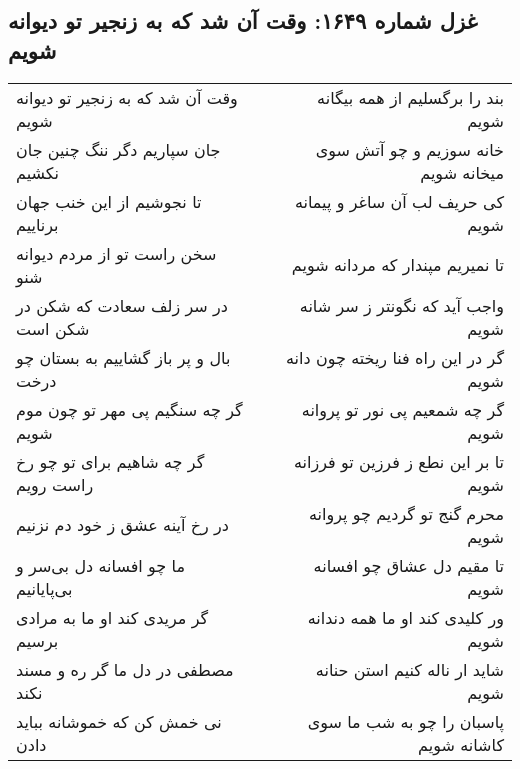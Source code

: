 \begin{center}
\section*{غزل شماره ۱۶۴۹: وقت آن شد که به زنجیر تو دیوانه شویم}
\label{sec:1649}
\begin{longtable}{l p{0.5cm} r}
وقت آن شد که به زنجیر تو دیوانه شویم
&&
بند را برگسلیم از همه بیگانه شویم
\\
جان سپاریم دگر ننگ چنین جان نکشیم
&&
خانه سوزیم و چو آتش سوی میخانه شویم
\\
تا نجوشیم از این خنب جهان برناییم
&&
کی حریف لب آن ساغر و پیمانه شویم
\\
سخن راست تو از مردم دیوانه شنو
&&
تا نمیریم مپندار که مردانه شویم
\\
در سر زلف سعادت که شکن در شکن است
&&
واجب آید که نگونتر ز سر شانه شویم
\\
بال و پر باز گشاییم به بستان چو درخت
&&
گر در این راه فنا ریخته چون دانه شویم
\\
گر چه سنگیم پی مهر تو چون موم شویم
&&
گر چه شمعیم پی نور تو پروانه شویم
\\
گر چه شاهیم برای تو چو رخ راست رویم
&&
تا بر این نطع ز فرزین تو فرزانه شویم
\\
در رخ آینه عشق ز خود دم نزنیم
&&
محرم گنج تو گردیم چو پروانه شویم
\\
ما چو افسانه دل بی‌سر و بی‌پایانیم
&&
تا مقیم دل عشاق چو افسانه شویم
\\
گر مریدی کند او ما به مرادی برسیم
&&
ور کلیدی کند او ما همه دندانه شویم
\\
مصطفی در دل ما گر ره و مسند نکند
&&
شاید ار ناله کنیم استن حنانه شویم
\\
نی خمش کن که خموشانه بباید دادن
&&
پاسبان را چو به شب ما سوی کاشانه شویم
\\
\end{longtable}
\end{center}
